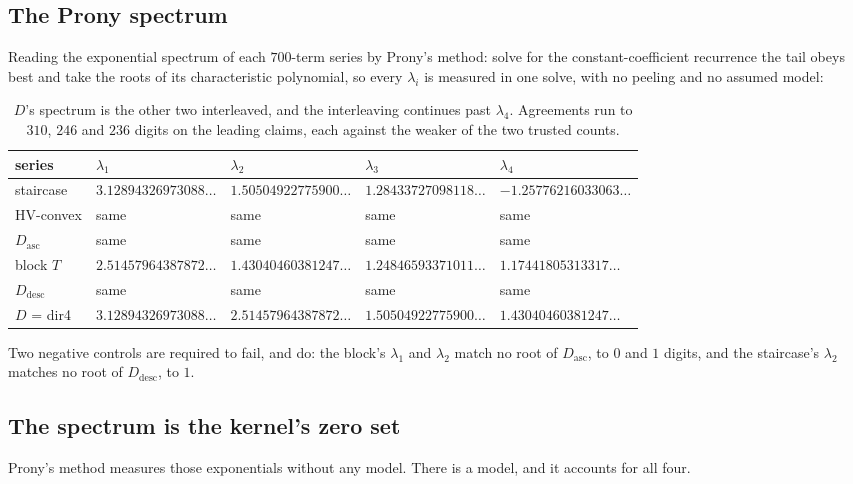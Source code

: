 \documentclass[11pt]{article}
\begin{document}
\subsection{The Prony spectrum}

Reading the exponential spectrum of each $700$-term series by Prony's method:
solve for the constant-coefficient recurrence the tail obeys best and take the
roots of its characteristic polynomial, so every $\lambda_i$ is measured in one
solve, with no peeling and no assumed model:

\begin{table}[H]
\centering\footnotesize\setlength{\tabcolsep}{4pt}
\begin{tabular}{l l l l l}
\toprule
series & $\lambda_1$ & $\lambda_2$ & $\lambda_3$ & $\lambda_4$ \\
\midrule
staircase & $3.12894326973088\dots$ & $1.50504922775900\dots$ & $1.28433727098118\dots$ & $-1.25776216033063\dots$ \\
HV-convex & same & same & same & same \\
$D_{\mathrm{asc}}$ & same & same & same & same \\
block $T$ & $2.51457964387872\dots$ & $1.43040460381247\dots$ & $1.24846593371011\dots$ & $1.17441805313317\dots$ \\
$D_{\mathrm{desc}}$ & same & same & same & same \\
$D$ = dir4 & $3.12894326973088\dots$ & $2.51457964387872\dots$ & $1.50504922775900\dots$ & $1.43040460381247\dots$ \\
\bottomrule
\end{tabular}
\caption{$D$'s spectrum is the other two interleaved, and the interleaving
continues past $\lambda_4$. Agreements run to $310$, $246$ and $236$ digits on
the leading claims, each against the weaker of the two trusted counts.}
\label{tab:prony}
\end{table}

Two negative controls are required to fail, and do: the block's $\lambda_1$ and
$\lambda_2$ match no root of $D_{\mathrm{asc}}$, to $0$ and $1$ digits, and the
staircase's $\lambda_2$ matches no root of $D_{\mathrm{desc}}$, to $1$.

\subsection{The spectrum is the kernel's zero set}
\label{sec:kernelspectrum}

Prony's method measures those exponentials without any model. There is a model,
and it accounts for all four.
\end{document}
